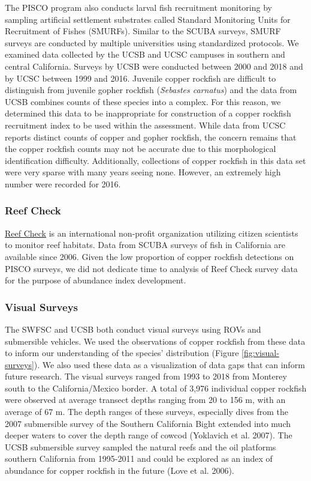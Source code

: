 \documentclass[11pt,
  english,
  letterpaper,
]{article}
\begin{document}
The PISCO program also conducts larval fish recruitment monitoring by sampling artificial settlement substrates called Standard Monitoring Units for Recruitment of Fishes (SMURFs). Similar to the SCUBA surveys, SMURF surveys are conducted by multiple universities using standardized protocols. We examined data collected by the UCSB and UCSC campuses in southern and central California. Surveys by UCSB were conducted between 2000 and 2018 and by UCSC between 1999 and 2016. Juvenile copper rockfish are difficult to distinguish from juvenile gopher rockfish (\emph{Sebastes carnatus}) and the data from UCSB combines counts of these species into a complex. For this reason, we determined this data to be inappropriate for construction of a copper rockfish recruitment index to be used within the assessment. While data from UCSC reports distinct counts of copper and gopher rockfish, the concern remains that the copper rockfish counts may not be accurate due to this morphological identification difficulty. Additionally, collections of copper rockfish in this data set were very sparse with many years seeing none. However, an extremely high number were recorded for 2016.

\hypertarget{reef-check}{%
\subsubsection{Reef Check}\label{reef-check}}

\href{https://www.reefcheck.org/}{Reef Check} is an international non-profit organization utilizing citizen scientists to monitor reef habitats. Data from SCUBA surveys of fish in California are available since 2006. Given the low proportion of copper rockfish detections on PISCO surveys, we did not dedicate time to analysis of Reef Check survey data for the purpose of abundance index development.

\hypertarget{visual-surveys}{%
\subsubsection{Visual Surveys}\label{visual-surveys}}

The SWFSC and UCSB both conduct visual surveys using ROVs and submersible vehicles. We used the observations of copper rockfish from these data to inform our understanding of the species' distribution (Figure \ref{fig:visual-surveys}). We also used these data as a visualization of data gaps that can inform future research. The visual surveys ranged from 1993 to 2018 from Monterey south to the California/Mexico border. A total of 3,976 individual copper rockfish were observed at average transect depths ranging from 20 to 156 m, with an average of 67 m. The depth ranges of these surveys, especially dives from the 2007 submersible survey of the Southern California Bight extended into much deeper waters to cover the depth range of cowcod (Yoklavich et al. 2007). The UCSB submersible survey sampled the natural reefs and the oil platforms southern California from 1995-2011 and could be explored as an index of abundance for copper rockfish in the future (Love et al. 2006).
\end{document}
